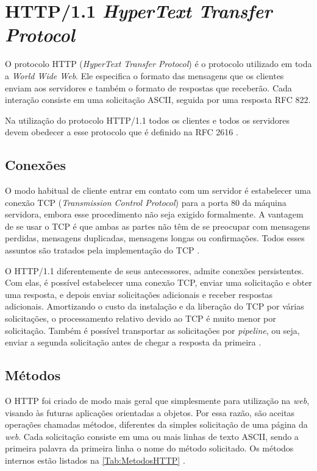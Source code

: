 \section{HTTP/1.1 \textit{HyperText Transfer Protocol}} \label{sec:Http}

O protocolo HTTP (\textit{HyperText Transfer Protocol}) é o protocolo utilizado em toda a \textit{World Wide Web}. Ele especifica o formato das mensagens que os clientes enviam aos servidores e também o formato de respostas que receberão. Cada interação consiste em uma solicitação ASCII, seguida por uma resposta RFC 822. 

Na utilização do protocolo HTTP/1.1 todos os clientes e todos os servidores devem obedecer a esse protocolo que é definido na RFC 2616 \cite{Tanenbaum:2003}.

\subsection{Conexões} \label{HTTP/1.1 - HyperText Transfer Protocol}

O modo habitual de cliente entrar em contato com um servidor é estabelecer uma conexão TCP (\textit{Transmission Control Protocol}) para a porta 80 da máquina servidora, embora esse procedimento não seja exigido formalmente. A vantagem de se usar o TCP é que ambas as partes não têm de se preocupar com mensagens perdidas, mensagens duplicadas, mensagens longas ou confirmações. Todos esses assuntos são tratados pela implementação do TCP \cite{Tanenbaum:2003}.

O HTTP/1.1 diferentemente de seus antecessores, admite conexões persistentes. Com elas, é possível estabelecer uma conexão TCP, enviar uma solicitação e obter uma resposta, e depois enviar solicitações adicionais e receber respostas adicionais. Amortizando o custo da instalação e
da liberação do TCP por várias solicitações, o processamento relativo devido ao TCP é muito menor por solicitação. Também é possível transportar as solicitações por \textit{pipeline}, ou seja, enviar a segunda solicitação antes de chegar a resposta da primeira \cite{Tanenbaum:2003}.



\subsection{Métodos} \label{subsec:Metodos}

O HTTP foi criado de modo mais geral que simplesmente para utilização na \textit{web}, visando às futuras aplicações orientadas a objetos. Por essa razão, são aceitas operações chamadas métodos, diferentes da simples solicitação de uma página da \textit{web}. Cada solicitação consiste em uma ou mais linhas de texto ASCII, sendo a primeira palavra da primeira linha o nome do método solicitado. Os métodos internos estão listados na \autoref{Tab:MetodosHTTP} \cite{Tanenbaum:2003}.



